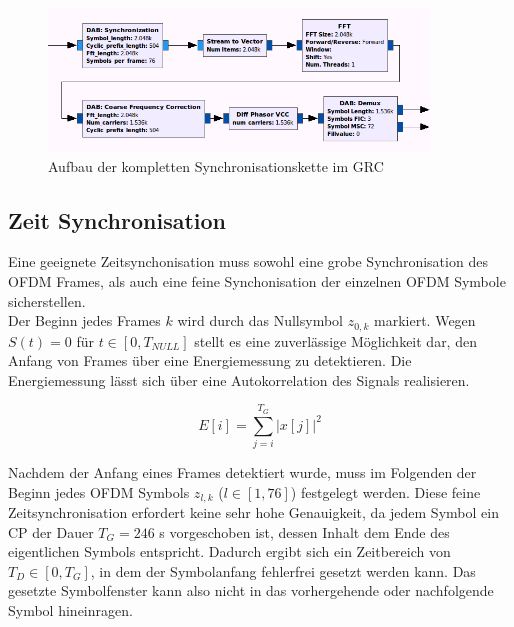 \begin{figure}[htb]
\centering
  \includegraphics[width=0.9\textwidth]{figures/sync_hier_block.png}
	\caption{Aufbau der kompletten Synchronisationskette im \ac{GRC}}
	\label{fig:sync_overview}
\end{figure}

\subsection{Zeit Synchronisation}
\label{sec:time_sync}
Eine geeignete Zeitsynchonisation muss sowohl eine grobe Synchronisation des OFDM Frames, als auch eine feine Synchonisation der einzelnen OFDM Symbole sicherstellen. \\
Der Beginn jedes Frames $ k $ wird durch das Nullsymbol $z_{0,k}$ markiert. Wegen $S(t) = 0$ für $t \in [0, T_{NULL}]$ stellt es eine zuverlässige Möglichkeit dar, den Anfang von Frames über eine Energiemessung zu detektieren. Die Energiemessung lässt sich über eine Autokorrelation des Signals realisieren.

\begin{equation}
E[i] = \sum \limits_{j=i}^{T_G}|x[j]|^2
\label{eq:energy}
\end{equation}

Nachdem der Anfang eines Frames detektiert wurde, muss im Folgenden der Beginn jedes OFDM Symbols $z_{l,k}$ ($l \in [1, 76]$) festgelegt werden. Diese feine Zeitsynchronisation erfordert keine sehr hohe Genauigkeit, da jedem Symbol ein \ac{CP} der Dauer $T_G = 246$ \textmu s vorgeschoben ist, dessen Inhalt dem Ende des eigentlichen Symbols entspricht. Dadurch ergibt sich ein Zeitbereich von  $T_D \in [0,T_G]$, in dem der Symbolanfang fehlerfrei gesetzt werden kann. Das gesetzte Symbolfenster kann also nicht in das vorhergehende oder nachfolgende Symbol hineinragen.


